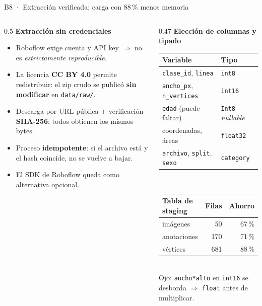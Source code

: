 \documentclass[aspectratio=169,10pt]{beamer}
\begin{document}
\begin{frame}{B8 · Extracción verificada; carga con 88\,\% menos memoria}
  \begin{columns}[T]
    \begin{column}{0.5\textwidth}
      \textbf{\color{itba}Extracción sin credenciales}\\[0.6ex]
      \small
      \begin{itemize}\setlength{\itemsep}{0.5ex}
        \item Roboflow exige cuenta y API key $\Rightarrow$ no es \emph{estrictamente reproducible}.
        \item La licencia \textbf{CC BY 4.0} permite redistribuir: el zip crudo se publicó \textbf{sin modificar} en \texttt{data/raw/}.
        \item Descarga por URL pública + verificación \textbf{SHA-256}: todos obtienen los mismos bytes.
        \item Proceso \textbf{idempotente}: si el archivo está y el hash coincide, no se vuelve a bajar.
        \item El SDK de Roboflow queda como alternativa opcional.
      \end{itemize}
    \end{column}
    \begin{column}{0.47\textwidth}
      \textbf{\color{itba}Elección de columnas y tipado}\\[0.6ex]
      \footnotesize
      \begin{tabular}{@{}ll@{}}
        \toprule
        Variable & Tipo \\ \midrule
        \texttt{clase\_id}, \texttt{linea} & \texttt{int8} \\
        \texttt{ancho\_px}, \texttt{n\_vertices} & \texttt{int16} \\
        \texttt{edad} (puede faltar) & \texttt{Int8} \emph{nullable} \\
        coordenadas, áreas & \texttt{float32} \\
        \texttt{archivo}, \texttt{split}, \texttt{sexo} & \texttt{category} \\ \bottomrule
      \end{tabular}\\[1.2ex]
      \begin{tabular}{@{}lrr@{}}
        \toprule
        Tabla de staging & Filas & Ahorro \\ \midrule
        imágenes & 50 & 67\,\% \\
        anotaciones & 170 & 71\,\% \\
        vértices & 681 & 88\,\% \\ \bottomrule
      \end{tabular}\\[0.8ex]
      {\scriptsize\color{alerta}Ojo: \texttt{ancho*alto} en \texttt{int16} se desborda $\Rightarrow$ \texttt{float} antes de multiplicar.}
    \end{column}
  \end{columns}
\end{frame}
\end{document}
